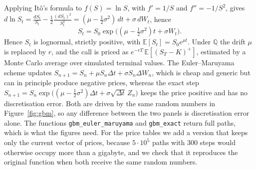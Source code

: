Applying It\^o's formula to $f(S)=\ln S$, with $f'=1/S$ and $f''=-1/S^2$, gives $d\ln S_t=\frac{dS_t}{S_t}-\frac12\frac{(dS_t)^2}{S_t^2}=(\mu-\tfrac12\sigma^2)\,dt+\sigma\,dW_t$, hence
\begin{equation}\label{eq:gbmsol}
 S_t=S_0\exp\!\Big((\mu-\tfrac12\sigma^2)t+\sigma W_t\Big).
\end{equation}
Hence $S_t$ is lognormal, strictly positive, with $\mathbb E[S_t]=S_0e^{\mu t}$.
Under $\mathbb Q$ the drift $\mu$ is replaced by $r$, and the call is priced as $e^{-rT}\,\mathbb E[(S_T-K)^+]$, estimated by a Monte Carlo average over simulated terminal values.
The Euler--Maruyama scheme updates $S_{n+1}=S_n+\mu S_n\Delta t+\sigma S_n\Delta W_n$, which is cheap and generic but can in principle produce negative prices, whereas the exact step $S_{n+1}=S_n\exp\big((\mu-\tfrac12\sigma^2)\Delta t+\sigma\sqrt{\Delta t}\,Z_n\big)$ keeps the price positive and has no discretisation error.
Both are driven by the same random numbers in Figure~\ref{fig:gbm}, so any difference between the two panels is discretisation error alone.
The functions \texttt{gbm\_euler\_maruyama} and \texttt{gbm\_exact} return full paths, which is what the figures need.
For the price tables we add a version that keeps only the current vector of prices, because $5\cdot10^5$ paths with 300 steps would otherwise occupy more than a gigabyte, and we check that it reproduces the original function when both receive the same random numbers.
